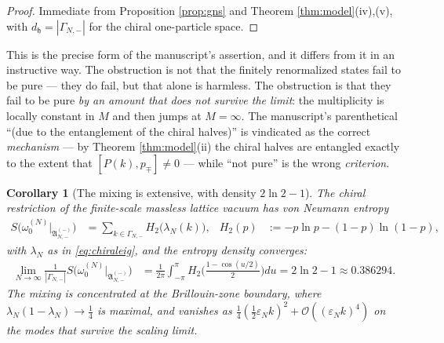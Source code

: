 \documentclass[11pt,a4paper]{article}
\newtheorem{cor}[thm]{Corollary}
\theoremstyle{definition}
\newcommand{\fA}{\mathfrak{A}}
\newcommand{\fh}{\mathfrak{h}}
\newcommand{\vep}{\varepsilon}
\newcommand{\1}{\mathds{1}}
\newcommand{\Gam}{\Gamma}
\begin{document}
\begin{proof}
Immediate from Proposition \ref{prop:gns} and Theorem \ref{thm:model}(iv),(v), with
$d_{\fh}=|\Gam_{N,-}|$ for the chiral one-particle space.
\end{proof}

This is the precise form of the manuscript's assertion, and it differs from it in an instructive
way. The obstruction is not that the finitely renormalized states fail to be pure --- they do fail,
but that alone is harmless. The obstruction is that they fail to be pure \emph{by an amount that does
not survive the limit}: the multiplicity is locally constant in $M$ and then jumps at $M=\infty$.
The manuscript's parenthetical ``(due to the entanglement of the chiral halves)'' is vindicated as
the correct \emph{mechanism} --- by Theorem \ref{thm:model}(ii) the chiral halves are entangled
exactly to the extent that $[P(k),p_{\mp}]\neq0$ --- while ``not pure'' is the wrong \emph{criterion}.

\begin{cor}[The mixing is extensive, with density $2\ln2-1$]
\label{cor:entropy}
The chiral restriction of the finite-scale massless lattice vacuum has von Neumann entropy
\begin{align}
\label{eq:entropy}
S\big(\omega^{(N)}_{0}|_{\fA^{(-)}_{N,-}}\big) & = \sum_{k\in\Gam_{N,-}}H_{2}\big(\lambda_{N}(k)\big),
 & H_{2}(p) & := -p\ln p-(1-p)\ln(1-p),
\end{align}
with $\lambda_{N}$ as in \eqref{eq:chiraleig}, and the entropy density converges:
\begin{align}
\label{eq:entropydensity}
\lim_{N\rightarrow\infty}\frac{1}{|\Gam_{N,-}|}
 S\big(\omega^{(N)}_{0}|_{\fA^{(-)}_{N,-}}\big)
 & = \frac{1}{2\pi}\int_{-\pi}^{\pi}\!H_{2}\Big(\frac{1-\cos(u/2)}{2}\Big)du = 2\ln2-1
 \approx0.386294.
\end{align}
The mixing is concentrated at the Brillouin-zone boundary, where
$\lambda_{N}(1-\lambda_{N})\rightarrow\tfrac{1}{4}$ is maximal, and vanishes as
$\tfrac{1}{4}(\tfrac{1}{2}\vep_{N}k)^{2}+\mathcal{O}((\vep_{N}k)^{4})$ on the modes that survive the
scaling limit.
\end{cor}
\end{document}
